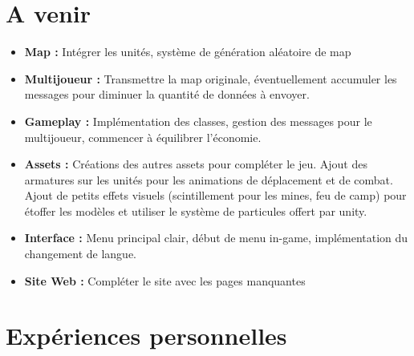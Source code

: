 \documentclass[12pt]{report}
\begin{document}
\chapter{A venir}

\begin{itemize}
	\item \textbf{Map :} Intégrer les unités, système de génération aléatoire de map
	\item \textbf{Multijoueur :} Transmettre la map originale, éventuellement accumuler les messages pour diminuer la quantité de données à envoyer.
	\item \textbf{Gameplay :} Implémentation des classes, gestion des messages pour le multijoueur, commencer à équilibrer l’économie.
	\item \textbf{Assets :} Créations des autres assets pour compléter le jeu. Ajout des armatures sur les unités pour les animations de déplacement et de combat. Ajout de petits effets visuels (scintillement pour les mines, feu de camp) pour étoffer les modèles et utiliser le système de particules offert par unity.
	\item \textbf{Interface :} Menu principal clair, début de menu in-game, implémentation du changement de langue.
	\item \textbf{Site Web :} Compléter le site avec les pages manquantes
\end{itemize}

\chapter{Expériences personnelles}
\end{document}
